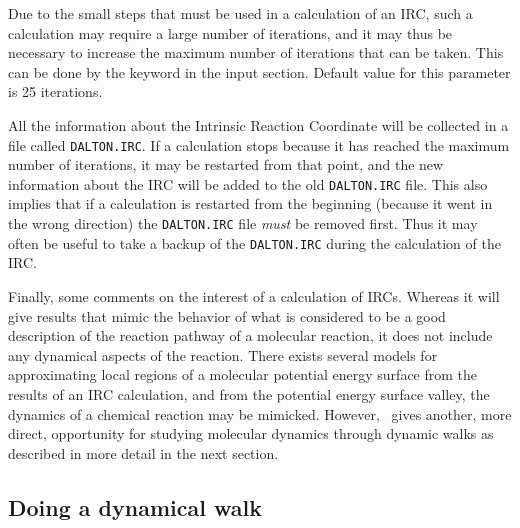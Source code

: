 Due to the small steps that must be used in a calculation of an IRC,
such a calculation may require a large number of
iterations, and it
may thus be necessary to increase the maximum number of iterations
that can be taken.  This can be done by 
the keyword  in the  input
section. Default value for this parameter is 25 iterations. 

All the information about the Intrinsic Reaction Coordinate will be
collected in a file called \texttt{DALTON.IRC}. If a
calculation stops 
because it has reached the maximum number of iterations, it may be
restarted from that point, and the new information about the IRC will
be added to the old \texttt{DALTON.IRC} file. This also implies that if a
calculation is restarted from the beginning (because it went in the
wrong direction) the \texttt{DALTON.IRC} file {\em must\/} be removed
first. Thus it may often be useful to take a backup of the
\texttt{DALTON.IRC} during the calculation of the IRC.  

Finally, some comments on the interest of a calculation of IRCs.
Whereas it will give results that mimic the behavior of what is
considered to be a good description of the reaction
pathway of a
molecular reaction, it does not include any dynamical aspects of the
reaction. There exists several models for approximating local regions of a
molecular potential energy surface from the results of an IRC
calculation, and from the
potential energy surface valley, the dynamics of a
chemical reaction may be 
mimicked. However, \siraba\ gives another, more direct, opportunity
for studying molecular dynamics through dynamic walks as described in
more detail in the next section.

\subsection{Doing a dynamical walk}\label{sec:dynamic}

\begin{center}
\end{center}


